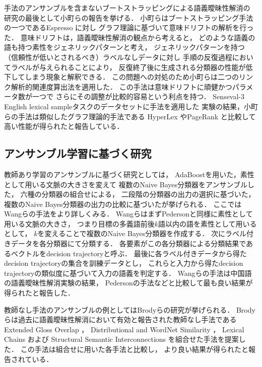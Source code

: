\documentclass[japanese]{jnlp_1.4}
\begin{document}
手法のアンサンブルを含まないブートストラッピングによる語義曖昧性解消の
研究の最後として小町らの報告\cite{Komachi10}を挙げる．
小町らはブートストラッピング手法の一つであるEspresso \cite{Pantel06}に対し
グラフ理論に基づいて意味ドリフト\cite{Curran07}の解析を行った．
意味ドリフトは，語義曖昧性解消の観点から考えると，
どのような語義の語も持つ素性をジェネリックパターンと考え，
ジェネリックパターンを持つ（信頼性が低いとされるべき）ラベルなしデータに対し
手順の反復過程においてラベルが与えられることにより，
反復終了後に生成される分類器の性能が低下してしまう現象と解釈できる．
この問題への対処のため小町らは二つのリンク解析的関連度算出法を適用した．
この手法は意味ドリフトに頑健かつパラメータ数が一つで
さらにその調整が比較的容易という利点を持つ．
Senseval-3 English lexical sampleタスクのデータセットに手法を適用した
実験の結果，小町らの手法は類似したグラフ理論的手法である
HyperLex \cite{Veronis04}やPageRank \cite{Agirre06}と比較して
高い性能が得られたと報告している．


\subsection{アンサンブル学習に基づく研究}
\label{sec:work2}

教師あり学習のアンサンブルに基づく研究としては，
AdaBoostを用いた\cite{Escudero00}，素性として用いる文脈の大きさを変えて
複数のNaive Bayes分類器をアンサンブルした\cite{Pedersen00}，
六種の分類器の組合せによる\cite{Florian02}，
二段階の分類器の出力の選択に基づいた\cite{Klein02}，
複数のNaive Bayes分類器の出力の比較に基づいた\cite{Wang04}が挙げられる．
ここではWangらの手法をより詳しくみる．
WangらはまずPedersonと同様に素性として用いる文脈の大きさ，
つまり目標の多義語前後$k$語以内の語を素性として用いるとして，
$k$を変えることで複数のNaive Bayes分類器を作成する．
次にラベル付きデータを各分類器にて分類する．
各要素がこの各分類器による分類結果であるベクトルをdecision trajectoryと呼ぶ．
最後に各ラベル付きデータから得たdecision trajectoryの集合を訓練データとし，
これらと入力から得たdecision trajectoryの類似度に基づいて入力の語義を判定する．
Wangらの手法は中国語の語義曖昧性解消実験の結果，
Pedersonの手法などと比較して最も良い結果が得られたと報告した．

教師なし手法のアンサンブルの例としてはBrodyらの研究\cite{Brody06}が挙げられる．
Brodyらは過去に語義曖昧性解消において有効と報告された教師なし手法である
Extended Gloss Overlap \cite{Banerjee03}，
Distributional and WordNet Similarity \cite{McCarthy04}，
Lexical Chains \cite{Galley03}および
Structural Semantic Interconnections \cite{Navigli05}を組合せた手法を提案した．
この手法は組合せに用いた各手法と比較し，
より良い結果が得られたと報告されている．
\end{document}
